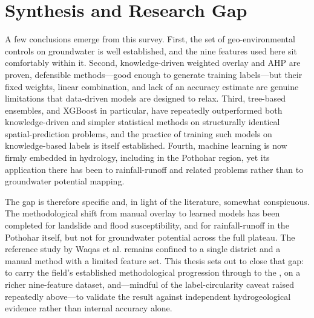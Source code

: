 \section{Synthesis and Research Gap}
\label{sec:lit_synthesis}

A few conclusions emerge from this survey. First, the set of geo-environmental
controls on groundwater is well established, and the nine features used here sit
comfortably within it. Second, knowledge-driven weighted overlay and AHP are
proven, defensible methods---good enough to generate training labels---but their
fixed weights, linear combination, and lack of an accuracy estimate are genuine
limitations that data-driven models are designed to relax. Third, tree-based
ensembles, and XGBoost in particular, have repeatedly outperformed both
knowledge-driven and simpler statistical methods on structurally identical
spatial-prediction problems, and the practice of training such models on
knowledge-based labels is itself established. Fourth, machine learning is now firmly
embedded in hydrology, including in the Pothohar region, yet its application there
has been to rainfall-runoff and related problems rather than to groundwater
potential mapping.

The gap is therefore specific and, in light of the literature, somewhat
conspicuous. The methodological shift from manual overlay to learned models has
been completed for landslide and flood susceptibility, and for rainfall-runoff in
the Pothohar itself, but not for groundwater potential across the full plateau.
The reference study by Waqas et al. \cite{waqas2022chakwal} remains confined to a
single district and a manual method with a limited feature set. This thesis sets
out to close that gap: to carry the field's established methodological progression
through to the \studyarea{}, on a richer nine-feature dataset, and---mindful of
the label-circularity caveat raised repeatedly above---to validate the result
against independent hydrogeological evidence rather than internal accuracy alone.
